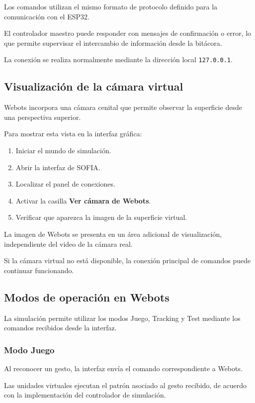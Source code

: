 \documentclass[letterpaper,journal]{IEEEtran}
\begin{document}
Los comandos utilizan el mismo formato
de protocolo definido para la comunicación
con el ESP32.

El controlador maestro puede responder
con mensajes de confirmación o error,
lo que permite supervisar el intercambio
de información desde la bitácora.

La conexión se realiza normalmente
mediante la dirección local
\texttt{127.0.0.1}.

\subsection{Visualización de la cámara virtual}

Webots incorpora una cámara cenital que
permite observar la superficie desde
una perspectiva superior.

Para mostrar esta vista en la
interfaz gráfica:

\begin{enumerate}
    \item Iniciar el mundo de simulación.
    \item Abrir la interfaz de SOFIA.
    \item Localizar el panel de conexiones.
    \item Activar la casilla
    \textbf{Ver cámara de Webots}.
    \item Verificar que aparezca
    la imagen de la superficie virtual.
\end{enumerate}

La imagen de Webots se presenta en
un área adicional de visualización,
independiente del video de la cámara real.

Si la cámara virtual no está disponible,
la conexión principal de comandos
puede continuar funcionando.

\subsection{Modos de operación en Webots}

La simulación permite utilizar los modos
Juego, Tracking y Test mediante los
comandos recibidos desde la interfaz.

\subsubsection{Modo Juego}

Al reconocer un gesto, la interfaz
envía el comando correspondiente
a Webots.

Las unidades virtuales ejecutan el
patrón asociado al gesto recibido,
de acuerdo con la implementación
del controlador de simulación.
\end{document}
